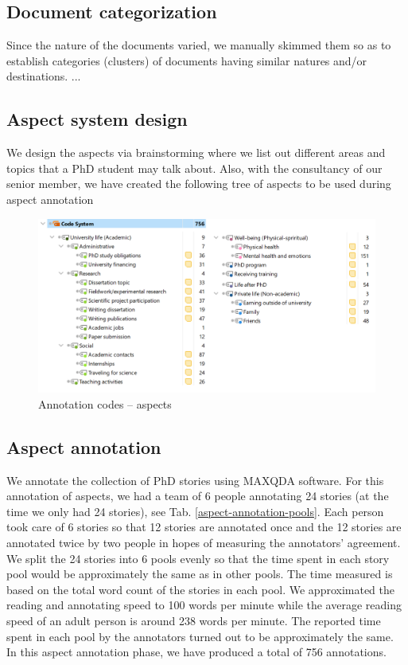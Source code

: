 \documentclass{kerauth}
\begin{document}
\subsection{Document categorization}
Since the nature of the documents varied, we manually skimmed them so as to establish categories (clusters) of documents having similar natures and/or destinations.
...
\subsection{Aspect system design}
We design the aspects via brainstorming where we list out different areas and topics that a PhD student may talk about. Also, with the consultancy of our senior member, we have created the following tree of aspects to be used during aspect annotation


\begin{figure}[ht]
  \centering
  \includegraphics[width=15cm]{figures/aspect-codes.png}
  \caption[aspect-codes]{Annotation codes -- aspects}
  \label{fig:aspect-codes}
\end{figure}

\subsection{Aspect annotation}
We annotate the collection of PhD stories using MAXQDA software. For this annotation of aspects, we had a team of 6 people annotating 24 stories (at the time we only had 24 stories), see Tab. \ref{aspect-annotation-pools}. Each person took care of 6 stories so that 12 stories are annotated once and the 12 stories are annotated twice by two people in hopes of measuring the annotators' agreement. We split the 24 stories into 6 pools evenly so that the time spent in each story pool would be approximately the same as in other pools. The time measured is based on the total word count of the stories in each pool. We approximated the reading and annotating speed to 100 words per minute while the average reading speed of an adult person is around 238 words per minute. The reported time spent in each pool by the annotators turned out to be approximately the same. In this aspect annotation phase, we have produced a total of 756 annotations.
\end{document}
